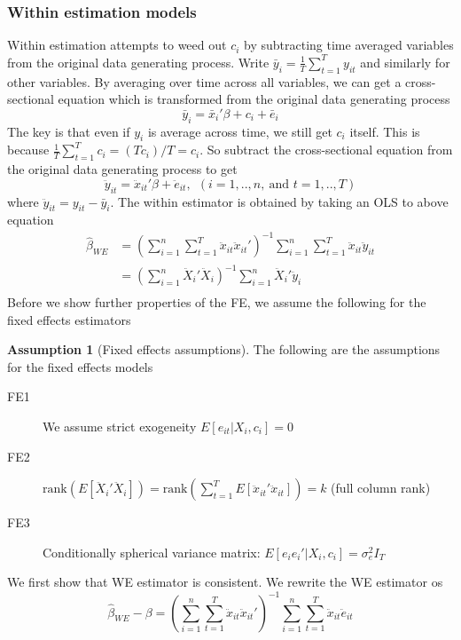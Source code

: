 \documentclass[12pt]{article}
\theoremstyle{definition}
\theoremstyle{property}
\theoremstyle{assumption}
\newtheorem{assumption}{Assumption}[section]
\theoremstyle{example}
\theoremstyle{comment}
\begin{document}
\subsubsection{Within estimation models}
 Within estimation attempts to weed out $c_i$ by subtracting time averaged variables from the original data generating process. Write $\bar{y}_i =\frac{1}{T}\sum_{t=1}^T y_{it}$ and similarly for other variables. By averaging over time across all variables, we can get a cross-sectional equation which is transformed from the original data generating process
\[
\bar{y}_i = \bar{x}_i'\beta + c_i+\bar{e}_i
\]
The key is that even if $y_i$ is average across time, we still get $c_i$ itself. This is because $\frac{1}{T}\sum_{t=1}^Tc_i = (Tc_i)/T=c_i$. So subtract the cross-sectional equation from the original data generating process to get
\[
\ddot{y}_{it}= \ddot{x}_{it}'\beta+\ddot{e}_{it}, \ \ (i=1,..,n, \ \text{and } t=1,..,T)
\]
where $\ddot{y}_{it}=y_{it}-\bar{y}_i$. The within estimator is obtained by taking an OLS to above equation
\[
\begin{aligned}
\hat{\beta}_{WE}&=\left(\sum_{i=1}^n\sum_{t=1}^T \ddot{x}_{it}\ddot{x}_{it}'\right)^{-1}\sum_{i=1}^n\sum_{t=1}^T \ddot{x}_{it}\ddot{y}_{it}\\
&=\left(\sum_{i=1}^n\ddot{X}_{i}'\ddot{X}_{i}\right)^{-1}\sum_{i=1}^n\ddot{X}_{i}'\ddot{y}_{i}\\
\end{aligned}
\]
Before we show further properties of the FE, we assume the following for the fixed effects estimators
\begin{mdframed}[backgroundcolor=blue!5] 
\begin{assumption}[Fixed effects assumptions]
The following are the assumptions for the fixed effects models
\begin{description}
\item[FE1] We assume strict exogeneity $E[e_{it}|X_i,c_i]=0$
\item[FE2] $\text{rank}\left(E [\ddot{X}_i' \ddot{X}_i]\right)=\text{rank}\left(\sum_{t=1}^T E [\ddot{x}_{it}' \ddot{x}_{it}]\right)=k$ (full column rank)
\item[FE3] Conditionally spherical variance matrix: $E[e_ie_i'|X_i,c_i]=\sigma_e^2 I_T$
\end{description}
\end{assumption}
\end{mdframed}
We first show that WE estimator is consistent. We rewrite the WE estimator os 
\[
\hat{\beta}_{WE}-\beta=\left(\sum_{i=1}^n\sum_{t=1}^T \ddot{x}_{it}\ddot{x}_{it}'\right)^{-1}\sum_{i=1}^n\sum_{t=1}^T \ddot{x}_{it}\ddot{e}_{it}
\]
\end{document}
